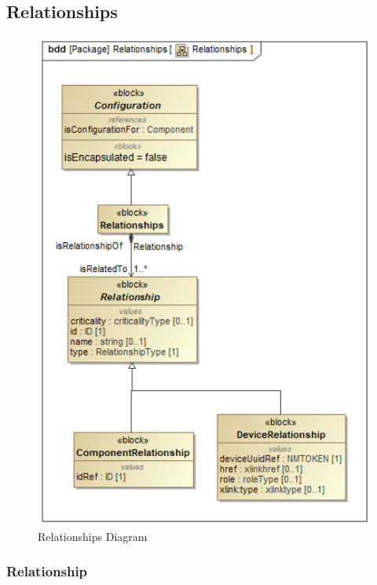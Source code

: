 \subsection{Relationships} \label{sec:Relationships}


\begin{figure}[ht]
  \centering
    \includegraphics[width=1.0\textwidth]{figures/Relationships.png}
  \caption{Relationships Diagram}
  \label{fig:Relationships}
\end{figure}

\FloatBarrier



\subsubsection{Relationship}
\label{sec:Relationship}



